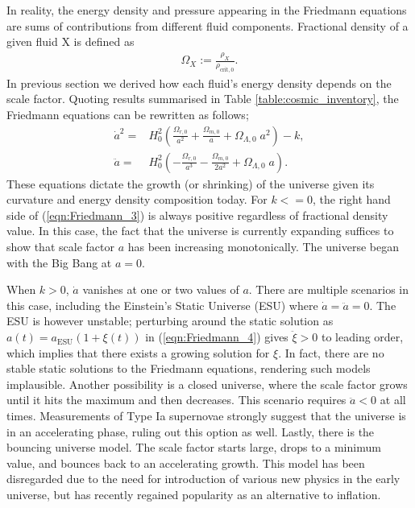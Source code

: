 In reality, the energy density and pressure appearing in the Friedmann equations are sums of contributions from different fluid components. Fractional density of a given fluid X is defined as
\begin{align}
	\Omega_X := \frac{\rho_X}{\rho_{\text{crit},0}}.
\end{align}
In previous section we derived how each fluid's energy density depends on the scale factor. Quoting results summarised in Table \ref{table:cosmic_inventory}, the Friedmann equations can be rewritten as follows;
\begin{align}
	\dot{a}^2 =& H_0^2 \left( \frac{\Omega_{r,0}}{a^2} + \frac{\Omega_{m,0}}{a} + \Omega_{\Lambda,0} \; a^2 \right) - k, \label{eqn:Friedmann_3}\\
	\ddot{a} =& H_0^2 \left( - \frac{\Omega_{r,0}}{a^3} - \frac{\Omega_{m,0}}{2a^2} + \Omega_{\Lambda,0} \; a \right). \label{eqn:Friedmann_4}
\end{align}
These equations dictate the growth (or shrinking) of the universe given its curvature and energy density composition today. For $k <= 0$, the right hand side of (\ref{eqn:Friedmann_3}) is always positive regardless of fractional density value. In this case, the fact that the universe is currently expanding suffices to show that scale factor $a$ has been increasing monotonically. The universe began with the Big Bang at $a=0$.

When $k > 0$, $\dot{a}$ vanishes at one or two values of $a$. There are multiple scenarios in this case, including the Einstein's Static Universe (ESU) where $\dot{a} = \ddot{a} = 0$. The ESU is however unstable; perturbing around the static solution as $a(t)=a_{\text{ESU}}(1+\xi(t))$ in (\ref{eqn:Friedmann_4}) gives $\ddot{\xi}>0$ to leading order, which implies that there exists a growing solution for $\xi$. In fact, there are no stable static solutions to the Friedmann equations, rendering such models implausible. Another possibility is a closed universe, where the scale factor grows until it hits the maximum and then decreases. This scenario requires $\ddot{a}<0$ at all times. Measurements of Type Ia supernovae strongly suggest that the universe is in an accelerating phase, ruling out this option as well. Lastly, there is the bouncing universe model. The scale factor starts large, drops to a minimum value, and bounces back to an accelerating growth. This model has been disregarded due to the need for introduction of various new physics in the early universe, but has recently regained popularity as an alternative to inflation.

